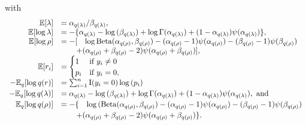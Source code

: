 \documentclass{amsart}[12pt]
\begin{document}
\noindent with 
\[
	\begin{array}{rl}
	\mathbb{E}[\lambda] &= \alpha_{q(\lambda)}/\beta_{q(\lambda)}, \\
		\mathbb{E} [\log{\lambda}] & = -\{ \alpha_{q(\lambda)} - \log{(\beta_{q(\lambda)})} + \log{\Gamma(\alpha_{q(\lambda)})} + (1 - \alpha_{q(\lambda)}) \psi{(\alpha_{q(\lambda)})} \},        \\
		\mathbb{E}[\log{\rho}]     & = - [ \quad \log{\text{Beta}(\alpha_{q(\rho)}, \beta_{q(\rho)})} - (\alpha_{q(\rho)} - 1) \psi{(\alpha_{q(\rho)})} - (\beta_{q(\rho)} - 1)\psi{(\beta_{q(\rho)})}  \\
		                    & \qquad + (\alpha_{q(\rho)} + \beta_{q(\rho)} - 2)\psi{(\alpha_{q(\rho)} + \beta_{q(\rho)})} ],                                                               
		\\
		\mathbb{E}[r_i]            & =                                                                                                                                                             
		\begin{cases}
		1                   & \text{if } y_i \ne 0                                                                                                                                          \\
		p_i                 & \text{if } y_i = 0,                                                                                                                                           \\
		\end{cases}
		\\
		-\mathbb{E}_q[\log{q(r)}]  & = \sum_{i=1}^n \text{I}(y_i = 0) \log{(p_i)}                                                                                                                        \\ [0.5ex]
		-\mathbb{E}_q[\log{q(\lambda)}] 
		                    & = \alpha_{q(\lambda)} - \log{(\beta_{q(\lambda)})} + \log{\Gamma{(\alpha_{q(\lambda)})}} + (1 - \alpha_{q(\lambda)}) \psi{(\alpha_{q(\lambda)})}, \text{ and }            \\ [0.5ex]
		\mathbb{E}_q[\log{q(\rho)}] & = - \{ \quad \log{(\text{Beta}(\alpha_{q(\rho)}, \beta_{q(\rho)})} - (\alpha_{q(\rho)} - 1) \psi{(\alpha_{q(\rho)})} - (\beta_{q(\rho)} - 1)\psi{(\beta_{q(\rho)})} \\ [0.5ex]
		                    & \qquad + (\alpha_{q(\rho)} + \beta_{q(\rho)} - 2)\psi{(\alpha_{q(\rho)} + \beta_{q(\rho)})} \}.                                                                \\ [0.5ex]
	\end{array}
\]
\end{document}
